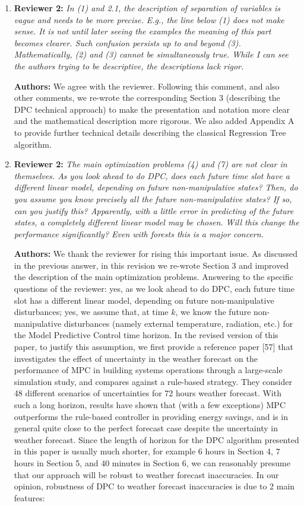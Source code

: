 \documentclass{article}
\begin{document}
\begin{enumerate}
\item \textbf{Reviewer 2:} \textit{In (1) and 2.1, the description of separation of variables is vague and needs to be more precise. E.g., the line below (1) does not make sense. It is not until later seeing the examples the meaning of this part becomes clearer. Such confusion persists up to and beyond (3). Mathematically, (2) and (3) cannot be simultaneously true. While I can see the authors trying to be descriptive, the descriptions lack rigor.} 



\textbf{Authors:} We agree with the reviewer. Following this comment, and also other comments, we re-wrote the corresponding Section 3 (describing the DPC technical approach) to make the presentation and notation more clear and the mathematical description more rigorous. We also added Appendix A to provide further technical details describing the classical Regression Tree algorithm.


\item \textbf{Reviewer 2:} \textit{The main optimization problems (4) and (7) are not clear in themselves. As you look ahead to do DPC, does each future time slot have a different linear model, depending on future non-manipulative states? Then, do you assume you know precisely all the future non-manipulative states? If so, can you justify this? Apparently, with a little error in predicting of the future states, a completely different linear model may be chosen. Will this change the performance significantly? Even with forests this is a major concern.}



\textbf{Authors:} We thank the reviewer for rising this important issue. As discussed in the previous answer, in this revision we re-wrote Section 3 and improved the description of the main optimization problems. Answering to the specific questions of the reviewer: yes, as we look ahead to do DPC, each future time slot has a different linear model, depending on future non-manipulative disturbances; yes, we assume that, at time $k$, we know the future non-manipulative disturbances (namely external temperature, radiation, etc.) for the Model Predictive Control time horizon. In the revised version of this paper, to justify this assumption, we first provide a reference paper [57] that investigates the effect of uncertainty in the weather forecast on the performance of MPC in building systems operations through a large-scale simulation study, and compares against a rule-based strategy. They consider 48 different scenarios of uncertainties for 72 hours weather forecast. With such a long horizon, results have shown that (with a few exceptions) MPC outperforms the rule-based controller in providing energy savings, and is in general quite close to the perfect forecast case despite the uncertainty in weather forecast. Since the length of horizon for the DPC algorithm presented in this paper is usually much shorter, for example $6$ hours in Section 4, $7$ hours in Section 5, and $40$ minutes in Section 6, we can reasonably presume that our approach will be robust to weather forecast inaccuracies. In our opinion, robustness of DPC to weather forecast inaccuracies is due to 2 main features:


\end{enumerate}
\end{document}
